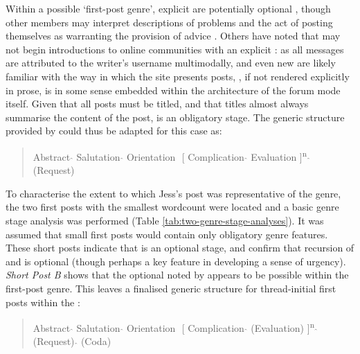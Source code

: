 %
Within a possible `first\hyp{}\gls{post} genre', explicit  are potentially optional \cite{vayreda_social_2009}, though other members may interpret descriptions of problems and the act of posting themselves as warranting the provision of advice \cite{goldsmith2000soliciting}. Others \cite[e.g. ][]{herring_two_1996,weber_missed_2011} have noted that  may not begin introductions to online communities with an explicit : as all messages are attributed to the writer's username multimodally, and even new  are likely familiar with the way in which the site presents \glspl{post}, , if not rendered explicitly in prose, is in some sense embedded within the architecture of the \gls{forum} \gls{mode} itself. Given that all \glspl{post} must be titled, and that titles almost always summarise the content of the \gls{post},  is an obligatory stage. The generic structure provided by \textcite{labov_narrative_1997} could thus be adapted for this case as:

\begin{quotation}\small
\noindent Abstract $\hat{}$ Salutation $\hat{}$ Orientation $\hat{}$ [ Complication $\hat{}$ Evaluation ]\textsuperscript{n} $\hat{}$ (Request)
\end{quotation}
%
To characterise the extent to which Jess's post was representative of the genre, the two first \glspl{post} with the smallest wordcount were located and a basic genre stage analysis was performed (Table \ref{tab:two-genre-stage-analyses}). It was assumed that small first \glspl{post} would contain only obligatory genre features. These short \glspl{post} indicate that  is an optional stage, and confirm that recursion of  and  is optional (though perhaps a key feature in developing a sense of urgency). \emph{Short Post B} shows that the optional  noted by \textcite{labov_narrative_1997} appears to be possible within the first\hyp{}\gls{post} genre. This leaves a finalised generic structure for \gls{thread}\hyp{}initial first \glspl{post} within the :

\begin{quotation}\small
\noindent Abstract $\hat{}$ Salutation $\hat{}$ Orientation $\hat{}$ [ Complication $\hat{}$ (Evaluation) ]\textsuperscript{n} $\hat{}$ (Request) $\hat{}$ (Coda)
\end{quotation}

